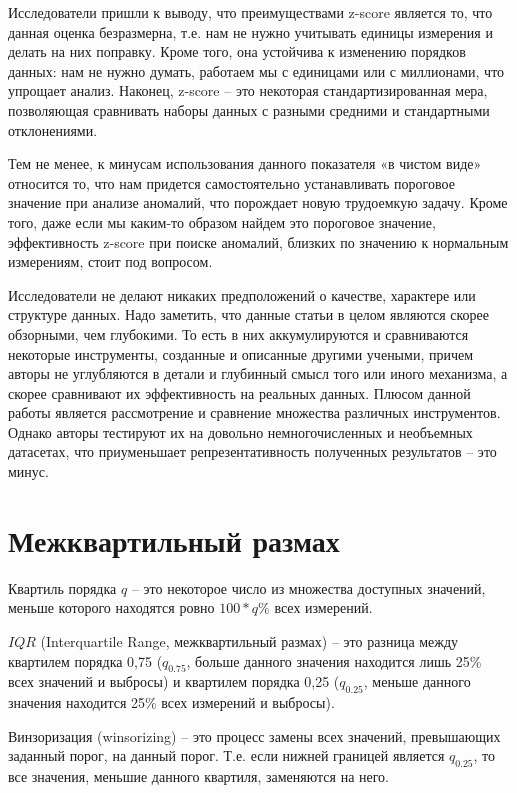 \documentclass[14pt, letterpaper]{extarticle}
\begin{document}
Исследователи пришли к выводу, что преимуществами z-score является то, что данная оценка безразмерна, т.е. нам не нужно учитывать единицы измерения и делать на них поправку. Кроме того, она устойчива к изменению порядков данных: нам не нужно думать, работаем мы с единицами или с миллионами, что упрощает анализ. Наконец, z-score – это некоторая стандартизированная мера, позволяющая сравнивать наборы данных с разными средними и стандартными отклонениями. 

Тем не менее, к минусам использования данного показателя «в чистом виде» относится то, что нам придется самостоятельно устанавливать пороговое значение при анализе аномалий, что порождает новую трудоемкую задачу. Кроме того, даже если мы каким-то образом найдем это пороговое значение, эффективность z-score при поиске аномалий, близких по значению к нормальным измерениям, стоит под вопросом.

Исследователи не делают никаких предположений о качестве, характере или структуре данных. Надо заметить, что данные статьи в целом являются скорее обзорными, чем глубокими. То есть в них аккумулируются и сравниваются некоторые инструменты, созданные и описанные другими учеными, причем авторы не углубляются в детали и глубинный смысл того или иного механизма, а скорее сравнивают их эффективность на реальных данных. Плюсом данной работы является рассмотрение и сравнение множества различных инструментов. Однако авторы тестируют их на довольно немногочисленных и необъемных датасетах, что приуменьшает репрезентативность полученных результатов – это минус.

\section{Межквартильный размах}

Квартиль порядка $q$ – это некоторое число из множества доступных значений, меньше которого находятся ровно $100*q\%$ всех измерений. 

$IQR$ (Interquartile Range, межквартильный размах) – это разница между квартилем порядка 0,75 ($q_{0.75}$, больше данного значения находится лишь 25\% всех значений и выбросы) и квартилем порядка 0,25 ($q_{0.25}$, меньше данного значения находится 25\% всех измерений и выбросы). 

Винзоризация (winsorizing) – это процесс замены всех значений, превышающих заданный порог, на данный порог. Т.е. если нижней границей является $q_{0.25}$, то все значения, меньшие данного квартиля, заменяются на него.
\end{document}
